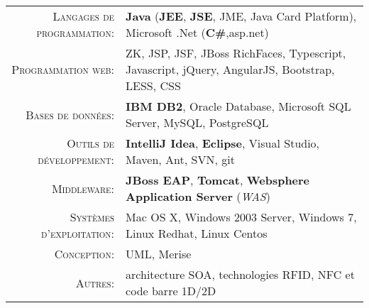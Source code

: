 %
%
%

\renewcommand{\arraystretch}{1.1}

	\begin{tabular}{>{}r>{}p{13cm}} 
		\textsc{Langages de programmation:}  		&   \textbf{Java} (\textbf{JEE}, \textbf{JSE}, JME, Java Card Platform), Microsoft .Net (\textbf{C\#},asp.net)\\ 
		\textsc{Programmation web:}               	&   ZK, JSP, JSF, JBoss RichFaces, Typescript, Javascript, jQuery, AngularJS, Bootstrap, LESS, CSS\\ 
		\textsc{Bases de données:}                  &   \textbf{IBM DB2}, Oracle Database, Microsoft SQL Server, MySQL, PostgreSQL \\ 
		\textsc{Outils de développement:}	  		&   \textbf {IntelliJ Idea}, \textbf {Eclipse}, Visual Studio, Maven, Ant, SVN, git\\
		\textsc{Middleware:}				        &   \textbf{JBoss EAP}, \textbf{Tomcat}, \textbf{Websphere Application Server} (\emph{WAS})\\ 
		\textsc{Systèmes d'exploitation:}	        &   Mac OS X, Windows 2003 Server, Windows 7, Linux Redhat, Linux Centos\\ 
		\textsc{Conception:}				        &   UML, Merise\\
		\textsc{Autres:}					        &   architecture SOA, technologies RFID, NFC et code barre 1D/2D
	\end{tabular}